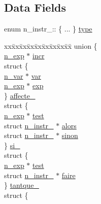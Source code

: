 \subsection*{Data Fields}
\begin{DoxyCompactItemize}
\item 
enum n\+\_\+instr\+\_\+\+:: \{ ... \}  \hyperlink{structn__instr___ac1cef081fef04ed702cb466cbfc300e4}{type}
\item 
\begin{tabbing}
xx\=xx\=xx\=xx\=xx\=xx\=xx\=xx\=xx\=\kill
union \{\\
\>\hyperlink{syntabs_8h_a9648f2af191445619fc50968978276c1}{n\_exp} $\ast$ \hyperlink{structn__instr___a8cf397866226e674ec340041c4169700}{incr}\\
\>struct \{\\
\>\>\hyperlink{syntabs_8h_ab219ef4489b1e38a9427841614795796}{n\_var} $\ast$ \hyperlink{structn__instr___a6210eed4fd6f8bd9cfc4072cbba4bfe1}{var}\\
\>\>\hyperlink{syntabs_8h_a9648f2af191445619fc50968978276c1}{n\_exp} $\ast$ \hyperlink{structn__instr___ac22e465b5efdf56f556993f0c54f0a12}{exp}\\
\>\} \hyperlink{structn__instr___a477700ec11eed06138503fde0d970389}{affecte\_}\\
\>struct \{\\
\>\>\hyperlink{syntabs_8h_a9648f2af191445619fc50968978276c1}{n\_exp} $\ast$ \hyperlink{structn__instr___abdc1abc752d872da13f257445a1158c9}{test}\\
\>\>struct \hyperlink{structn__instr__}{n\_instr\_} $\ast$ \hyperlink{structn__instr___a590bcf3870f00d8036aa2d0f7c321381}{alors}\\
\>\>struct \hyperlink{structn__instr__}{n\_instr\_} $\ast$ \hyperlink{structn__instr___a751624ac62b5074d809bb6281681c131}{sinon}\\
\>\} \hyperlink{structn__instr___ad381e1adb0aeb002b90aca8d28f9414e}{si\_}\\
\>struct \{\\
\>\>\hyperlink{syntabs_8h_a9648f2af191445619fc50968978276c1}{n\_exp} $\ast$ \hyperlink{structn__instr___abdc1abc752d872da13f257445a1158c9}{test}\\
\>\>struct \hyperlink{structn__instr__}{n\_instr\_} $\ast$ \hyperlink{structn__instr___ac78dae4a34d53fd09886337737f1405c}{faire}\\
\>\} \hyperlink{structn__instr___a22743cfec86334739c87e10f6c02fe7e}{tantque\_}\\
\>struct \{\\

\end{tabbing}
\end{DoxyCompactItemize}

